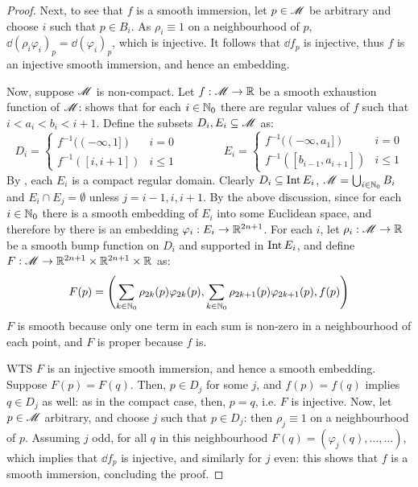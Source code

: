 \begin{proofbox}
\begin{proof}
    Next, to see that $ f $ is a smooth immersion, let $ p \in \mathscr{M} $ be arbitrary and choose $ i $ such that $ p \in B_i $. As $ \rho_i \equiv 1 $ on a neighbourhood of $ p $, $ \dd (\rho_i \varphi_i)_p = \dd (\varphi_i)_p $, which is injective. It follows that $ \dd f_p $ is injective, thus $ f $ is an injective smooth immersion, and hence an embedding.

    Now, suppose $ \mathscr{M} $ is non-compact. Let $ f : \mathscr{M} \rightarrow \mathbb{R} $ be a smooth exhaustion function of $ \mathscr{M} $:  shows that for each $ i \in \mathbb{N}_0 $ there are regular values of $ f $ such that $ i < a_i < b_i < i + 1 $. Define the subsets $ D_i , E_i \subseteq \mathscr{M} $ as:
    \begin{equation*}
      D_i =
      \begin{cases}
        f^{-1}((-\infty , 1]) & i = 0 \\
        f^{-1}([i , i+1]) & i \leq 1
      \end{cases}
      \qquad \qquad
      E_i =
      \begin{cases}
        f^{-1}((-\infty , a_1]) & i = 0 \\
        f^{-1}([b_{i-1} , a_{i+1}]) & i \leq 1
      \end{cases}
    \end{equation*}
    By , each $ E_i $ is a compact regular domain. Clearly $ D_i \subseteq \operatorname{Int} E_i $, $ \mathscr{M} = \bigcup_{i \in \mathbb{N}_0} B_i $ and $ E_i \cap E_j = \emptyset $ unless $ j = i-1,i,i+1 $. By the above discussion, since for each $ i \in \mathbb{N}_0 $ there is a smooth embedding of $ E_i $ into some Euclidean space, and therefore by  there is an embedding $ \varphi_i : E_i \rightarrow \mathbb{R}^{2n+1} $. For each $ i $, let $ \rho_i : \mathscr{M} \rightarrow \mathbb{R} $ be a smooth bump function on $ D_i $ and supported in $ \operatorname{Int} E_i $, and define $ F : \mathscr{M} \rightarrow \mathbb{R}^{2n+1} \times \mathbb{R}^{2n+1} \times \mathbb{R} $ as:
    \begin{equation*}
      F(p) = \left( \sum_{k \in \mathbb{N}_0} \rho_{2k}(p) \varphi_{2k}(p) , \sum_{k \in \mathbb{N}_0} \rho_{2k+1}(p) \varphi_{2k+1}(p) , f(p) \right)
    \end{equation*}
    $ F $ is smooth because only one term in each sum is non-zero in a neighbourhood of each point, and $ F $ is proper because $ f $ is.

    WTS $ F $ is an injective smooth immersion, and hence a smooth embedding. Suppose $ F(p) = F(q) $. Then, $ p \in D_j $ for some $ j $, and $ f(p) = f(q) $ implies $ q \in D_j $ as well: as in the compact case, then, $ p = q $, i.e. $ F $ is injective. Now, let $ p \in \mathscr{M} $ arbitrary, and choose $ j $ such that $ p \in D_j $: then $ \rho_j \equiv 1 $ on a neighbourhood of $ p $. Assuming $ j $ odd, for all $ q $ in this neighbourhood $ F(q) = (\varphi_j(q) , \dots , \dots) $, which implies that $ \dd f_p $ is injective, and similarly for $ j $ even: this shows that $ f $ is a smooth immersion, concluding the proof.
  \end{proof}
\end{proofbox}

